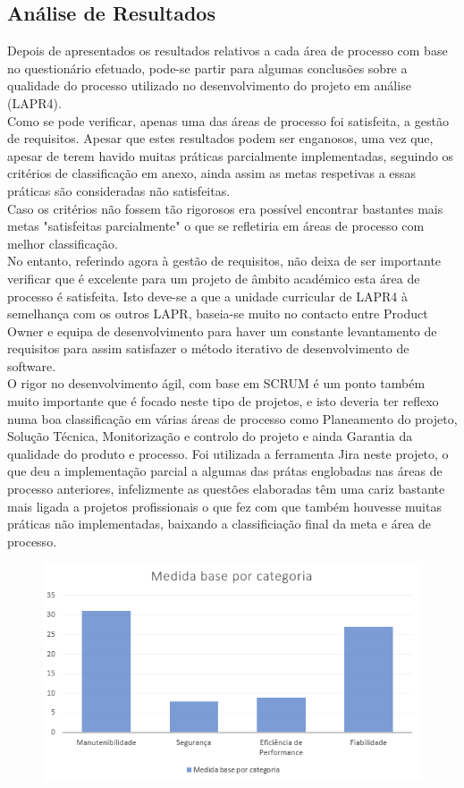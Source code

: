 \documentclass[openany,10pt,a4paper]{article}
\begin{document}
\subsection{Análise de Resultados}
Depois de apresentados os resultados relativos a cada área de processo com base no questionário efetuado, pode-se partir para algumas conclusões sobre a qualidade do processo utilizado no desenvolvimento do projeto em análise (LAPR4). \\
Como se pode verificar, apenas uma das áreas de processo foi satisfeita, a gestão de requisitos. Apesar que estes resultados podem ser enganosos, uma vez que, apesar de terem havido muitas práticas parcialmente implementadas, seguindo os critérios de classificação em anexo, ainda assim as metas respetivas a essas práticas são consideradas não satisfeitas.\\
Caso os critérios não fossem tão rigorosos era possível encontrar bastantes mais metas "satisfeitas parcialmente" o que se refletiria em áreas de processo com melhor classificação.\\
No entanto, referindo agora à gestão de requisitos, não deixa de ser importante verificar que é excelente para um projeto de âmbito académico esta área de processo é satisfeita. Isto deve-se a que a unidade curricular de LAPR4 à semelhança com os outros LAPR, baseia-se muito no contacto entre Product Owner e equipa de desenvolvimento para haver um constante levantamento de requisitos para assim satisfazer o método iterativo de desenvolvimento de software. \\
O rigor no desenvolvimento ágil, com base em SCRUM é um ponto também muito importante que é focado neste tipo de projetos, e isto deveria ter reflexo numa boa classificação em várias áreas de processo como Planeamento do projeto, Solução Técnica, Monitorização e controlo do projeto e ainda Garantia da qualidade do produto e processo. Foi utilizada a ferramenta Jira neste projeto, o que deu a implementação parcial a algumas das prátas englobadas nas áreas de processo anteriores, infelizmente as questões elaboradas têm uma cariz bastante mais ligada a projetos profissionais o que fez com que também houvesse muitas práticas não implementadas, baixando a classificiação final da meta e área de processo.

\begin{figure}[h]
	\centering
	\includegraphics[width=1\linewidth]{graph_results_product.PNG}
	\caption{}
	\label{fig_quality}
\end{figure}
\end{document}
